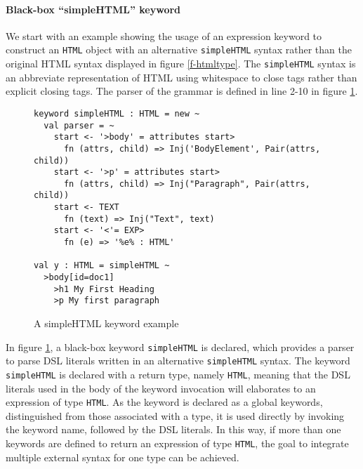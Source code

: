 \documentclass{sig-alternate}
\begin{document}
\paragraph{Black-box ``simpleHTML'' keyword}
We start with an example showing the usage of an expression keyword to construct an \verb|HTML| object with an alternative \verb|simpleHTML| syntax rather than the original HTML syntax displayed in figure \ref{f-htmltype}. The \verb|simpleHTML| syntax is an abbreviate representation of HTML using whitespace to close tags rather than explicit closing tags. The parser of the grammar is defined in line 2-10 in figure \ref{f-simplehtml}.
\begin{figure}[ht]
\begin{lstlisting}[style=wyvern]
keyword simpleHTML : HTML = new ~
  val parser = ~
    start <- '>body' = attributes start>
      fn (attrs, child) => Inj('BodyElement', Pair(attrs, child))
    start <- '>p' = attributes start>
      fn (attrs, child) => Inj("Paragraph", Pair(attrs, child))
    start <- TEXT
      fn (text) => Inj("Text", text)
    start <- '<'= EXP>
      fn (e) => '%e% : HTML'

val y : HTML = simpleHTML ~
  >body[id=doc1]
    >h1 My First Heading
    >p My first paragraph
\end{lstlisting}
\vspace{-8px}
\caption{A simpleHTML keyword example}
\vspace{-10px}
\label{f-simplehtml}
\end{figure}

In figure \ref{f-simplehtml}, a black-box keyword \texttt{simpleHTML} is declared, which provides a parser to parse DSL literals written in an alternative \verb|simpleHTML| syntax. The keyword \texttt{simpleHTML} is declared with a return type, namely \texttt{HTML}, meaning that the DSL literals used in the body of the keyword invocation will elaborates to an expression of type \texttt{HTML}. As the keyword is declared as a global keywords, distinguished from those associated with a type, it is used directly by invoking the keyword name, followed by the DSL literals. In this way, if more than one keywords are defined to return an expression of type \verb|HTML|, the goal to integrate multiple external syntax for one type can be achieved.
\end{document}
